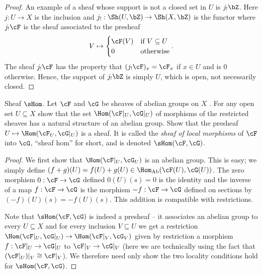 \begin{problemset}
\begin{proof}
		An example of a sheaf whose support is not a closed set in $U$ is $j_!\bZ$. Here $j:U\to X$ is the inclusion and $j_!:\Sh(U,\bZ)\to \Sh(X,\bZ)$ is the functor where $j_!\cF$ is the sheaf associated to the presheaf
		\begin{align*}
			V \mapsto
			\begin{cases}
				\cF(V) &\text{if } V\subseteq U \\
				0 & \text{otherwise}
			\end{cases}.
		\end{align*}
		The sheaf $j_!\cF$ has the property that $(j_!\cF)_x = \cF_x$ if $x \in U$ and is $0$ otherwise. Hence, the support of $j_!\bZ$ is simply $U$, which is open, not necessarily closed.
	\end{proof}
	\item Sheaf $\sHom$. Let $\cF$ and $\cG$ be sheaves of abelian groups on $X$ . For any open set $U\subseteq X$ show that the set $\Hom(\cF|_U,\cG|_U)$ of morphisms of the restricted sheaves has a natural structure of an abelian group. Show that the presheaf $U\mapsto \Hom(\cF_U,\cG|_U)$ is a sheaf. It is called the \emph{sheaf of local morphisms} of $\cF$ into $\cG$, ``sheaf hom'' for short, and is denoted $\sHom(\cF,\cG)$.
	\begin{proof}
		We first show that $\Hom(\cF|_U,\cG_U)$ is an abelian group. This is easy; we simply define $(f+g)(U) = f(U) + g(U) \in \Hom_{\text{Ab}}(\cF(U), \cG(U))$. The zero morphism $0:\cF\to \cG$ defined $0(U)(s) = 0$ is the identity and the inverse of a map $f:\cF\to \cG$ is the morphism $-f:\cF\to \cG$ defined on sections by $(-f)(U)(s) = -f(U)(s)$. This addition is compatible with restrictions.

		Note that $\sHom(\cF,\cG)$ is indeed a presheaf -- it associates an abelian group to every $U\subseteq X$ and for every inclusion $V\subseteq U$ we get a restriction $\Hom(\cF|_U,\cG|_U) \to \Hom(\cF|_V,\cG_V)$ given by restriction a morphism $f:\cF|_U\to \cG|_U$ to $\cF|_V\to \cG|_V$ (here we are technically using the fact that $(\cF|_U)|_V \cong \cF|_V$). We therefore need only show the two locality conditions hold for $\sHom(\cF,\cG)$.

		\bigskip


\end{proof}
\end{problemset}
